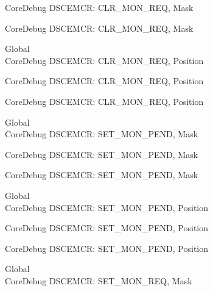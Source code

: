 \begin{DoxyRefList}
\label{deprecated__deprecated000523}%
%
Core\+Debug DSCEMCR\+: CLR\+\_\+\+MON\+\_\+\+REQ, Mask 

\label{deprecated__deprecated000625}%
%
Core\+Debug DSCEMCR\+: CLR\+\_\+\+MON\+\_\+\+REQ, Mask  
\item[Global \doxylink{group___c_m_s_i_s___s_c_b_ga1e2e3a310143f4663f1c415c03c3d535}{Core\+Debug\+\_\+\+DSCEMCR\+\_\+\+CLR\+\_\+\+MON\+\_\+\+REQ\+\_\+\+Pos} ]\hfill \\
\label{deprecated__deprecated000071}%
%
Core\+Debug DSCEMCR\+: CLR\+\_\+\+MON\+\_\+\+REQ, Position 

\label{deprecated__deprecated000522}%
%
Core\+Debug DSCEMCR\+: CLR\+\_\+\+MON\+\_\+\+REQ, Position 

\label{deprecated__deprecated000624}%
%
Core\+Debug DSCEMCR\+: CLR\+\_\+\+MON\+\_\+\+REQ, Position  
\item[Global \doxylink{group___c_m_s_i_s___s_c_b_ga575045239507b73f338bcbb959ac6904}{Core\+Debug\+\_\+\+DSCEMCR\+\_\+\+SET\+\_\+\+MON\+\_\+\+PEND\+\_\+\+Msk} ]\hfill \\
\label{deprecated__deprecated000078}%
%
Core\+Debug DSCEMCR\+: SET\+\_\+\+MON\+\_\+\+PEND, Mask 

\label{deprecated__deprecated000529}%
%
Core\+Debug DSCEMCR\+: SET\+\_\+\+MON\+\_\+\+PEND, Mask 

\label{deprecated__deprecated000631}%
%
Core\+Debug DSCEMCR\+: SET\+\_\+\+MON\+\_\+\+PEND, Mask  
\item[Global \doxylink{group___c_m_s_i_s___s_c_b_ga644ae3a13bcb9f2a80326bc5824f1b28}{Core\+Debug\+\_\+\+DSCEMCR\+\_\+\+SET\+\_\+\+MON\+\_\+\+PEND\+\_\+\+Pos} ]\hfill \\
\label{deprecated__deprecated000077}%
%
Core\+Debug DSCEMCR\+: SET\+\_\+\+MON\+\_\+\+PEND, Position 

\label{deprecated__deprecated000528}%
%
Core\+Debug DSCEMCR\+: SET\+\_\+\+MON\+\_\+\+PEND, Position 

\label{deprecated__deprecated000630}%
%
Core\+Debug DSCEMCR\+: SET\+\_\+\+MON\+\_\+\+PEND, Position  
\item[Global \doxylink{group___c_m_s_i_s___s_c_b_ga73d8960abbd67eeda64f27a77ed7baf2}{Core\+Debug\+\_\+\+DSCEMCR\+\_\+\+SET\+\_\+\+MON\+\_\+\+REQ\+\_\+\+Msk} ]\hfill \\
\label{deprecated__deprecated000076}%
%
Core\+Debug DSCEMCR\+: SET\+\_\+\+MON\+\_\+\+REQ, Mask 


\end{DoxyRefList}
